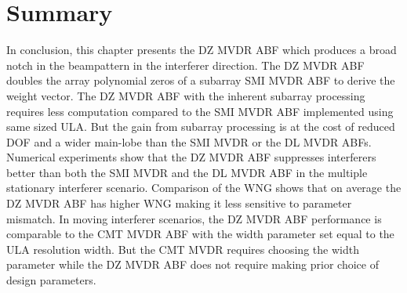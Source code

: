 

\section{Summary}
\label{sec:dzmvdr-summary}
In conclusion, this chapter presents the DZ MVDR ABF which produces
a broad notch in the beampattern in the interferer direction. The DZ
MVDR ABF doubles the array polynomial zeros of a subarray SMI MVDR ABF
to derive the weight vector. The DZ MVDR ABF with the inherent
subarray processing requires less computation compared to the SMI MVDR
ABF implemented using same sized ULA. But the gain from subarray
processing is at the cost of reduced DOF and a wider main-lobe than the
SMI MVDR or the DL MVDR ABFs. Numerical experiments show that the DZ
MVDR ABF suppresses interferers better than both the SMI MVDR and the
DL MVDR ABF in the multiple stationary interferer scenario. Comparison
of the WNG shows that on average the DZ MVDR ABF has higher WNG making
it less sensitive to parameter mismatch. In moving interferer
scenarios, the DZ MVDR ABF performance is comparable to the CMT MVDR
ABF with the width parameter set equal to the ULA resolution
width. But the CMT MVDR requires choosing the width parameter while
the DZ MVDR ABF does not require making prior choice of design
parameters.

